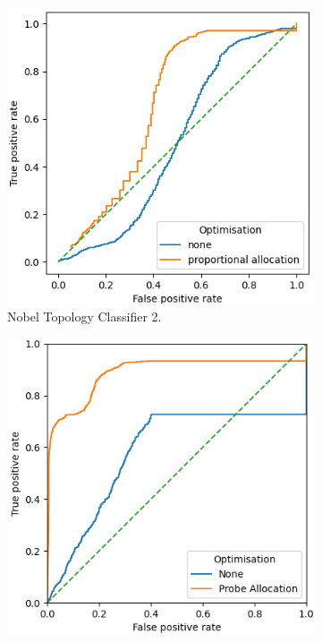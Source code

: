 \begin{figure}[H]
    \centering
    \begin{subfigure}[H]{0.475\textwidth}
        \includegraphics[width=\textwidth]{figs/results/nobel-germany_ac2_opt.png}
        \caption{Nobel Topology Classifier 2.}
    \end{subfigure}
    \begin{subfigure}[H]{0.475\textwidth}
        \includegraphics[width=\textwidth]{figs/results/nobel-germany_ac3_opt.png}

\end{subfigure}
\end{figure}
